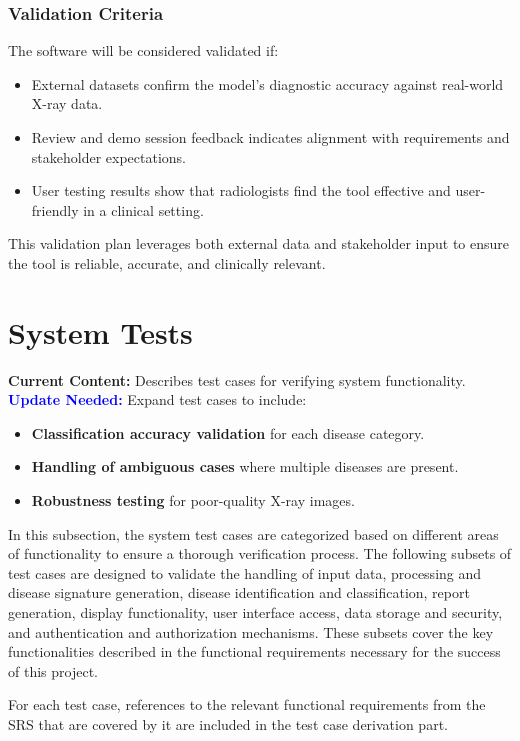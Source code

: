 \documentclass[12pt, titlepage]{article}
\begin{document}
\subsubsection{Validation Criteria}
The software will be considered validated if:
\begin{itemize}
  \item External datasets confirm the model’s diagnostic accuracy against real-world X-ray data.
  \item Review and demo session feedback indicates alignment with requirements and stakeholder expectations.
  \item User testing results show that radiologists find the tool effective and user-friendly in a clinical setting.
\end{itemize}
This validation plan leverages both external data and stakeholder input to ensure the tool is reliable, accurate, and clinically relevant.

\section{System Tests}

\textbf{Current Content:} Describes test cases for verifying system functionality. \\
\textbf{\textcolor{blue}{Update Needed:}} Expand test cases to include:
\begin{itemize}
    \item \textbf{Classification accuracy validation} for each disease category.
    \item \textbf{Handling of ambiguous cases} where multiple diseases are present.
    \item \textbf{Robustness testing} for poor-quality X-ray images.
\end{itemize}

In this subsection, the system test cases are categorized based on different areas of
functionality to ensure a thorough verification process. The following subsets of test cases are
designed to validate the handling of input data, processing and disease signature generation,
disease identification and classification, report generation, display functionality, user
interface access, data storage and security, and authentication and authorization mechanisms.
These subsets cover the key functionalities described in the functional requirements necessary for
the success of this project.

For each test case, references to the relevant functional requirements from the SRS that are
covered by it are included in the test case derivation part.
\end{document}

